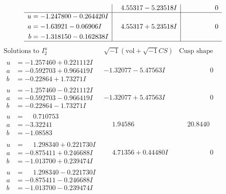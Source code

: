 \documentclass[1p]{elsarticle_modified}
\theoremstyle{definition}
\newcommand{\I}{\sqrt{-1}}
\begin{document}
$$\begin{array}{c|c|c}
 & \phantom{-}4.55317 - 5.23518 I & \phantom{-0.000000 } 0 \\ \hline\begin{aligned}
u &= -1.247800 - 0.264420 I \\
a &= -1.63921 - 0.06906 I \\
b &= -1.318150 - 0.162838 I\end{aligned}
 & \phantom{-}4.55317 + 5.23518 I & \phantom{-0.000000 } 0\\
 \hline 
 \end{array}$$\newpage$$\begin{array}{c|c|c}  
\text{Solutions to }I^u_{2}& \I (\text{vol} + \sqrt{-1}CS) & \text{Cusp shape}\\
 \hline 
\begin{aligned}
u &= -1.257460 + 0.221112 I \\
a &= -0.592703 + 0.966419 I \\
b &= -0.22864 + 1.73271 I\end{aligned}
 & -1.32077 - 5.47563 I & \phantom{-0.000000 } 0 \\ \hline\begin{aligned}
u &= -1.257460 - 0.221112 I \\
a &= -0.592703 - 0.966419 I \\
b &= -0.22864 - 1.73271 I\end{aligned}
 & -1.32077 + 5.47563 I & \phantom{-0.000000 } 0 \\ \hline\begin{aligned}
u &= \phantom{-}0.710753\phantom{ +0.000000I} \\
a &= -3.32241\phantom{ +0.000000I} \\
b &= -1.08583\phantom{ +0.000000I}\end{aligned}
 & \phantom{-}1.94586\phantom{ +0.000000I} & \phantom{-}20.8440\phantom{ +0.000000I} \\ \hline\begin{aligned}
u &= \phantom{-}1.298340 + 0.221730 I \\
a &= -0.875411 + 0.246688 I \\
b &= -1.013700 + 0.239474 I\end{aligned}
 & \phantom{-}4.71356 + 0.44480 I & \phantom{-0.000000 } 0 \\ \hline\begin{aligned}
u &= \phantom{-}1.298340 - 0.221730 I \\
a &= -0.875411 - 0.246688 I \\
b &= -1.013700 - 0.239474 I\end{aligned}

\end{array}$$
\end{document}

